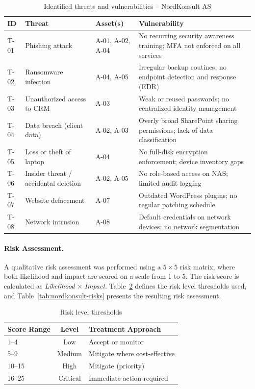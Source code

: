 \begin{table}[ht]
\centering
\caption{Identified threats and vulnerabilities -- NordKonsult AS}
\label{tab:nordkonsult-threats}
\small
\begin{tabular}{lp{3cm}lp{5.5cm}}
\hline
\textbf{ID} & \textbf{Threat} & \textbf{Asset(s)} & \textbf{Vulnerability} \\
\hline
T-01 & Phishing attack               & A-01, A-02, A-04 & No recurring security awareness training; MFA not enforced on all services \\
T-02 & Ransomware infection           & A-04, A-05       & Irregular backup routines; no endpoint detection and response (EDR) \\
T-03 & Unauthorized access to CRM     & A-03             & Weak or reused passwords; no centralized identity management \\
T-04 & Data breach (client data)      & A-02, A-03       & Overly broad SharePoint sharing permissions; lack of data classification \\
T-05 & Loss or theft of laptop        & A-04             & No full-disk encryption enforcement; device inventory gaps \\
T-06 & Insider threat / accidental deletion & A-02, A-05  & No role-based access on NAS; limited audit logging \\
T-07 & Website defacement             & A-07             & Outdated WordPress plugins; no regular patching schedule \\
T-08 & Network intrusion              & A-08             & Default credentials on network devices; no network segmentation \\
\hline
\end{tabular}
\end{table}
 
\paragraph{Risk Assessment.}
A qualitative risk assessment was performed using a $5 \times 5$ risk matrix, where both likelihood and impact are scored on a scale from 1 to 5. The risk score is calculated as \textit{Likelihood} $\times$ \textit{Impact}. Table~\ref{tab:nordkonsult-risk-levels} defines the risk level thresholds used, and Table~\ref{tab:nordkonsult-risks} presents the resulting risk assessment.
 
\begin{table}[ht]
\centering
\caption{Risk level thresholds}
\label{tab:nordkonsult-risk-levels}
\begin{tabular}{lcl}
\hline
\textbf{Score Range} & \textbf{Level} & \textbf{Treatment Approach} \\
\hline
1--4    & Low      & Accept or monitor \\
5--9    & Medium   & Mitigate where cost-effective \\
10--15  & High     & Mitigate (priority) \\
16--25  & Critical & Immediate action required \\
\hline
\end{tabular}
\end{table}
 
